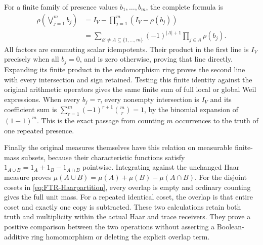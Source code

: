 For a finite family of presence values $b_1,\ldots,b_m$,
the complete formula is
\begin{equation}\tag{FTR32}\label{eq:FTR-finiteoverlap}
 \begin{aligned}
 \rho\!\left(\bigvee_{j=1}^m b_j\right)
 &=I_V-\prod_{j=1}^m(I_V-\rho(b_j))\\
 &=\sum_{\varnothing\ne A\subseteq\{1,\ldots,m\}}
       (-1)^{|A|+1}\prod_{j\in A}\rho(b_j).
 \end{aligned}
\end{equation}
All factors are commuting scalar idempotents. Their product
in the first line is $I_V$ precisely when all $b_j=0$, and
is zero otherwise, proving that line directly. Expanding its
finite product in the endomorphism ring proves the second line
with every intersection and sign retained.
Testing this finite identity against the original arithmetic
operators gives the same finite sum of full local or global
Weil expressions. When every $b_j=\tau$, every nonempty
intersection is $I_V$ and its coefficient sum is
$\sum_{r=1}^m(-1)^{r+1}\binom mr=1$, by the binomial
expansion of $(1-1)^m$. This is the exact passage from
counting $m$ occurrences to the truth of one repeated presence.

Finally the original measures themselves have this relation on
measurable finite-mass subsets, because their characteristic
functions satisfy
$1_{A\cup B}=1_A+1_B-1_{A\cap B}$ pointwise.
Integrating against the unchanged Haar measure proves
$\mu(A\cup B)=\mu(A)+\mu(B)-\mu(A\cap B)$.
For the disjoint cosets in \eqref{eq:FTR-Haarpartition}, every
overlap is empty and ordinary counting gives the full unit
mass. For a repeated identical coset, the overlap is that
entire coset and exactly one copy is subtracted. These two
calculations retain both truth and multiplicity within the
actual Haar and trace receivers. They prove a positive
comparison between the two operations without asserting a
Boolean-additive ring homomorphism or deleting the explicit
overlap term.
